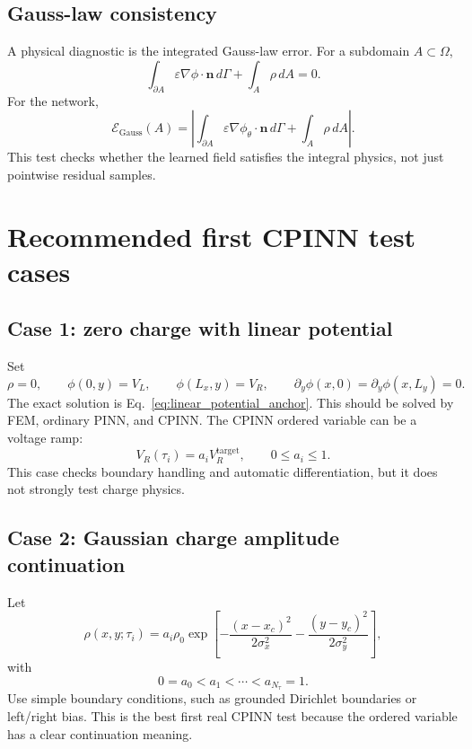 \documentclass[11pt]{article}
\newcommand{\nvecb}{\mathbf{n}}
\newcommand{\phinn}{\phi_{\theta}}
\newcommand{\Om}{\Omega}
\newcommand{\taud}{\tau}
\begin{document}
\subsection{Gauss-law consistency}

A physical diagnostic is the integrated Gauss-law error. For a subdomain $A\subset\Om$,
\begin{equation}
\int_{\partial A}\varepsilon\nabla\phi\cdot\nvecb\,d\Gamma+
\int_A\rho\,dA=0.
\end{equation}
For the network,
\begin{equation}
\mathcal{E}_{\mathrm{Gauss}}(A)=
\left|\int_{\partial A}\varepsilon\nabla\phinn\cdot\nvecb\,d\Gamma+
\int_A\rho\,dA\right|.
\end{equation}
This test checks whether the learned field satisfies the integral physics, not just pointwise residual samples.

\section{Recommended first CPINN test cases}

\subsection{Case 1: zero charge with linear potential}

Set
\begin{equation}
\rho=0,
\qquad
\phi(0,y)=V_L,
\qquad
\phi(L_x,y)=V_R,
\qquad
\partial_y\phi(x,0)=\partial_y\phi(x,L_y)=0.
\end{equation}
The exact solution is Eq.~\eqref{eq:linear_potential_anchor}. This should be solved by FEM, ordinary PINN, and CPINN. The CPINN ordered variable can be a voltage ramp:
\begin{equation}
V_R(\taud_i)=a_iV_R^{\mathrm{target}},
\qquad
0\le a_i\le 1.
\end{equation}
This case checks boundary handling and automatic differentiation, but it does not strongly test charge physics.

\subsection{Case 2: Gaussian charge amplitude continuation}

Let
\begin{equation}
\rho(x,y;\taud_i)=a_i\rho_0\exp\left[-\frac{(x-x_c)^2}{2\sigma_x^2}-\frac{(y-y_c)^2}{2\sigma_y^2}\right],
\label{eq:gaussian_charge_continuation}
\end{equation}
with
\begin{equation}
0=a_0<a_1<\cdots<a_{N_\taud}=1.
\end{equation}
Use simple boundary conditions, such as grounded Dirichlet boundaries or left/right bias. This is the best first real CPINN test because the ordered variable has a clear continuation meaning.
\end{document}
